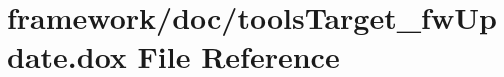 \hypertarget{tools_target__fw_update_8dox}{}\section{framework/doc/tools\+Target\+\_\+fw\+Update.dox File Reference}
\label{tools_target__fw_update_8dox}
